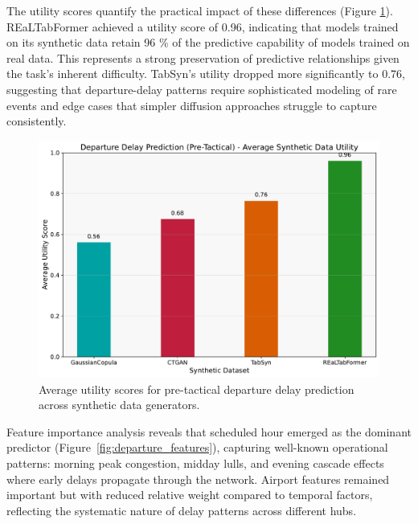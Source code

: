 \documentclass[conference]{IEEEtran}
\begin{document}
The utility scores quantify the practical impact of these differences (Figure \ref{fig:departure_utility}). REaLTabFormer achieved a utility score of 0.96, indicating that models trained on its synthetic data retain 96 \% of the predictive capability of models trained on real data. This represents a strong preservation of predictive relationships given the task's inherent difficulty. TabSyn's utility dropped more significantly to 0.76, suggesting that departure-delay patterns require sophisticated modeling of rare events and edge cases that simpler diffusion approaches struggle to capture consistently.

\begin{figure}[htbp]
    \centering
    \includegraphics[width=0.8\linewidth]{plots/departure_delay_min_pre-tactical/departure_delay_min_pre-tactical_avg_utility.pdf}
    \caption{Average utility scores for pre-tactical departure delay prediction across synthetic data generators.}
    \label{fig:departure_utility}
\end{figure}

Feature importance analysis reveals that scheduled hour emerged as the dominant predictor (Figure~\ref{fig:departure_features}), capturing well-known operational patterns: morning peak congestion, midday lulls, and evening cascade effects where early delays propagate through the network. Airport features remained important but with reduced relative weight compared to temporal factors, reflecting the systematic nature of delay patterns across different hubs.
\end{document}
